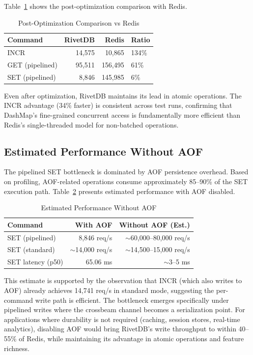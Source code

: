 \documentclass[conference,a4paper]{IEEEtran}
\begin{document}
Table~\ref{tab:postopt} shows the post-optimization comparison with Redis.

\begin{table}[htbp]
\caption{Post-Optimization Comparison vs Redis}
\label{tab:postopt}
\centering
\begin{tabular}{@{}lrrl@{}}
\toprule
\textbf{Command} & \textbf{RivetDB} & \textbf{Redis} & \textbf{Ratio} \\
\midrule
INCR & 14,575 & 10,865 & 134\% \\
GET (pipelined) & 95,511 & 156,495 & 61\% \\
SET (pipelined) & 8,846 & 145,985 & 6\% \\
\bottomrule
\end{tabular}
\end{table}

Even after optimization, RivetDB maintains its lead in atomic operations. The INCR advantage (34\% faster) is consistent across test runs, confirming that DashMap's fine-grained concurrent access is fundamentally more efficient than Redis's single-threaded model for non-batched operations.

\subsection{Estimated Performance Without AOF}

The pipelined SET bottleneck is dominated by AOF persistence overhead. Based on profiling, AOF-related operations consume approximately 85--90\% of the SET execution path. Table~\ref{tab:noaof} presents estimated performance with AOF disabled.

\begin{table}[htbp]
\caption{Estimated Performance Without AOF}
\label{tab:noaof}
\centering
\begin{tabular}{@{}lrr@{}}
\toprule
\textbf{Command} & \textbf{With AOF} & \textbf{Without AOF (Est.)} \\
\midrule
SET (pipelined) & 8,846 req/s & $\sim$60,000--80,000 req/s \\
SET (standard) & $\sim$14,000 req/s & $\sim$14,500--15,000 req/s \\
SET latency (p50) & 65.06 ms & $\sim$3--5 ms \\
\bottomrule
\end{tabular}
\end{table}

This estimate is supported by the observation that INCR (which also writes to AOF) already achieves 14,741 req/s in standard mode, suggesting the per-command write path is efficient. The bottleneck emerges specifically under pipelined writes where the crossbeam channel becomes a serialization point. For applications where durability is not required (caching, session stores, real-time analytics), disabling AOF would bring RivetDB's write throughput to within 40--55\% of Redis, while maintaining its advantage in atomic operations and feature richness.
\end{document}
